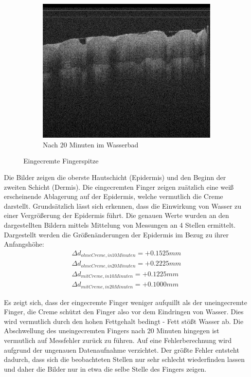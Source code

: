 \documentclass[german, %
parskip=full, %
bibliography=totoc, %
]{scrartcl}
\begin{document}
\begin{figure}[ht]
\begin{subfigure}[b]{0.3\textwidth}
	   \includegraphics[width=\textwidth]{finger_creme_3}
		 \caption{Nach 20 Minuten im Wasserbad}
	\end{subfigure}
  \caption{Eingecremte Fingerspitze}
	\label{fig:creme}
\end{figure}

Die Bilder zeigen die oberste Hautschicht (Epidermis) und den Beginn der zweiten Schicht (Dermis). Die eingecremten Finger zeigen zuätzlich eine weiß erscheinende Ablagerung auf der Epidermis, welche vermutlich die Creme darstellt. Grundsätzlich lässt sich erkennen, dass die Einwirkung von Wasser zu einer Vergrößerung der Epidermis führt. Die genauen Werte wurden an den dargestellten Bildern mittels Mittelung von Messungen an 4 Stellen ermittelt. Dargestellt werden die Größenänderungen der Epidermis im Bezug zu ihrer Anfangshöhe:
\begin{align*}
\Delta d_{ohne Creme, in 10 Minuten} = +0.1525 mm \\
\Delta d_{ohne Creme, in 20 Minuten} = +0.2225 mm \\
\Delta d_{mit Creme, in 10 Minuten} = +0.1225 mm \\
\Delta d_{mit Creme, in 20 Minuten} = +0.1000 mm
\end{align*}

Es zeigt sich, dass der eingecremte Finger weniger aufquillt als der uneingecremte Finger, die Creme schützt den Finger also vor dem Eindringen von Wasser. Dies wird vermutlich durch den hohen Fettgehalt bedingt - Fett stößt Wasser ab. Die Abschwellung des uneingecremten Fingers nach 20 Minuten hingegen ist vermutlich auf Messfehler zurück zu führen.
Auf eine Fehlerberechnung wird aufgrund der ungenauen Datenaufnahme verzichtet. Der größte Fehler entsteht dadurch, dass sich die beobachteten Stellen nur sehr schlecht wiederfinden lassen und daher die Bilder nur in etwa die selbe Stelle des Fingers zeigen.
\end{document}
